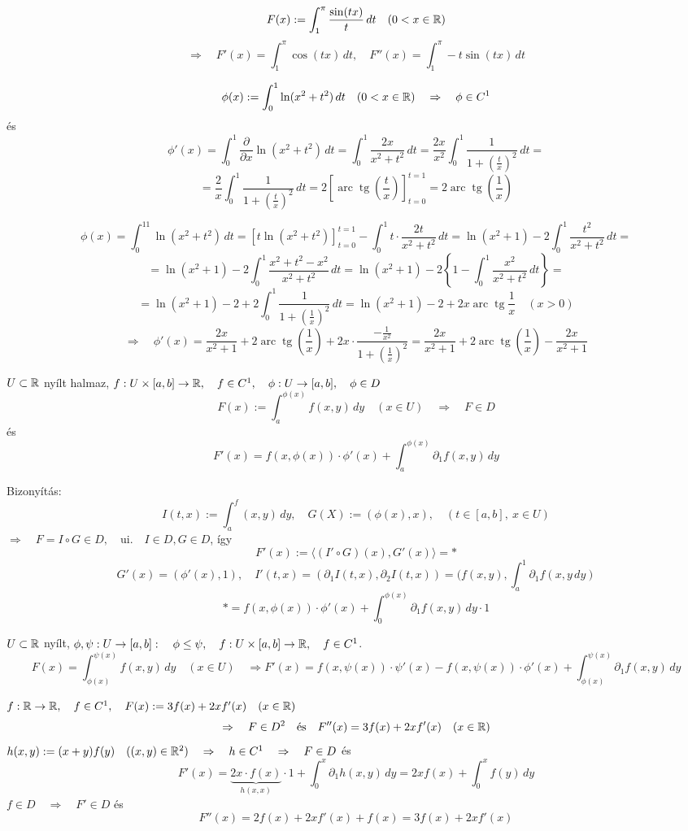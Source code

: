 \documentclass[a4paper,11.5pt]{article}
\DeclareMathOperator{\tg}{tg}
\DeclareMathOperator{\arc}{arc}
\begin{document}
	\begin{example}
		\[ F(x):=\int_1^\pi \frac{\sin(tx)}{t}\,dt\quad (0<x\in\mathbb{R}) \]
		\[ \Rightarrow\quad F'(x)=\int_1^\pi\cos(tx)\,dt,\quad F''(x)=\int_1^\pi -t\sin(tx)\,dt \]
	\end{example}
	\begin{example}
		$$\phi(x):=\int_0^1\ln(x^2+t^2)\,dt\quad (0<x\in\mathbb{R})\quad \Rightarrow\quad \phi\in C^1$$ és $$\phi'(x)=\int_0^1\frac{\partial}{\partial x}\ln(x^2+t^2)\,dt=\int_0^1\frac{2x}{x^2+t^2}\,dt=\frac{2x}{x^2}\int_0^1\frac{1}{1+\left(\frac{t}{x}\right)^2}\,dt=$$
		$$=\frac{2}{x}\int_0^1\frac{1}{1+\left(\frac{t}{x}\right)^2}\,dt=2\left[\arc\tg\left(\frac{t}{x}\right)\right]_{t=0}^{t=1}=2\arc\tg\left(\frac{1}{x}\right)$$
	\end{example}
	\begin{note}
		$$\phi(x)=\int_0^11\ln(x^2+t^2)\,dt=[t\ln(x^2+t^2)]_{t=0}^{t=1}-\int_0^1t\cdot\frac{2t}{x^2+t^2}\,dt=\ln(x^2+1)-2\int_0^1\frac{t^2}{x^2+t^2}\,dt=$$
		$$=\ln(x^2+1)-2\int_0^1\frac{x^2+t^2-x^2}{x^2+t^2}\,dt=\ln(x^2+1)-2\left\{ 1-\int_0^1\frac{x^2}{x^2+t^2}\,dt \right\}=$$ $$=\ln(x^2+1)-2+2\int_0^1\frac{1}{1+\left(\frac{1}{x}\right)^2}\,dt=\ln(x^2+1)-2+2x\arc\tg\frac{1}{x}\quad (x>0)$$
		$$\Rightarrow\quad \phi'(x)=\frac{2x}{x^2+1}+2\arc\tg\left(\frac{1}{x}\right)+2x\cdot\frac{-\frac{1}{x^2}}{1+\left(\frac{1}{x}\right)^2}=\frac{2x}{x^2+1}+2\arc\tg\left(\frac{1}{x}\right)-\frac{2x}{x^2+1}$$
	\end{note}
	\begin{theorem}
		$U\subset\mathbb{R}$ nyílt halmaz, $f:U\times[a,b]\to\mathbb{R},\quad f\in C^1,\quad \phi:U\to[a,b],\quad \phi\in D$
		\[ F(x):=\int_a^{\phi(x)}f(x,y)\,dy\quad (x\in U)\quad \Rightarrow\quad F\in D \]
		és
		\[ F'(x)=f(x,\phi(x))\cdot\phi'(x)+\int_a^{\phi(x)}\partial_1 f(x,y)\,dy \]
		
		Bizonyítás: 
		\[ I(t,x):=\int_a^f(x,y) \,dy,\quad G(X):=(\phi(x),x),\quad (t\in[a,b],\ x\in U) \]
		$ \Rightarrow\quad F=I\circ G\in D,\quad \text{ui.}\quad I\in D, G\in D$, így
		\[ F'(x):=\langle (I'\circ G)(x),G'(x)\rangle=* \]
		\[ G'(x)=(\phi'(x),1),\quad I'(t,x)=(\partial_1I(t,x),\partial_2I(t,x))=(f(x,y),\int_a^1\partial_1f\left(x,y\,dy\right) \]
		\[ *=f(x,\phi(x))\cdot \phi'(x)+\int_0^{\phi(x)}\partial_1f(x,y)\,dy\cdot1 \]
	\end{theorem}
	\begin{note}
		$U\subset\mathbb{R}$ nyílt, $\phi, \psi:U\to[a,b]:\quad \phi\leq\psi,\quad f:U\times[a,b]\to\mathbb{R},\quad f\in C^1$.
		\[ F(x)=\int_{\phi(x)}^{\psi(x)}f(x,y)\,dy\quad (x\in U)\quad \Rightarrow F'(x)=f(x,\psi(x))\cdot\psi'(x)-f(x,\psi(x))\cdot\phi'(x)+\int_{\phi(x)}^{\psi(x)}\partial_1f(x,y)\,dy \]
	\end{note}
	\begin{example}
		$f:\mathbb{R}\to\mathbb{R},\quad f\in C^1,\quad F(x):=3f(x)+2xf'(x)\quad (x\in\mathbb{R})$
		\[ \Rightarrow\quad F\in D^2\quad \text{és}\quad F''(x)=3f(x)+2xf'(x)\quad (x\in\mathbb{R}) \]
		$h(x,y):=(x+y)f(y)\quad ((x,y)\in\mathbb{R}^2)\quad \Rightarrow\quad h\in C^1\quad \Rightarrow\quad F\in D$ és
		\[ F'(x)=\underbrace{2x\cdot f(x)}_{h(x,x)}\cdot1+\int_0^x\partial_1h(x,y)\,dy=2xf(x)+\int_0^xf(y)\,dy \]
		$f\in D\quad \Rightarrow\quad F'\in D$ és 
		\[ F''(x)=2f(x)+2xf'(x)+f(x)=3f(x)+2xf'(x) \]   
	\end{example}
\end{document}
